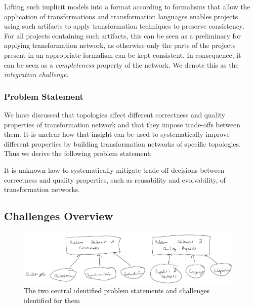 Lifting such implicit models into a format according to formalisms that allow the application of transformations and transformation languages enables projects using such artifacts to apply transformation techniques to preserve consistency.
For all projects containing such artifacts, this can be seen as a preliminary for applying transformation network, as otherwise only the parts of the projects present in an appropriate formalism can be kept consistent.
In consequence, it can be seen as a \emph{completeness} property of the network.
We denote this as the \emph{integration challenge}.

\subsubsection*{Problem Statement}

We have discussed that topologies affect different correctness and quality properties of transformation network and that they impose trade-offs between them.
It is unclear how that insight can be used to systematically improve different properties by building transformation networks of specific topologies.
Thus we derive the following problem statement:

\begin{problemstatement}
    It is unknown how to systematically mitigate trade-off decisions between correctness and quality properties, such as reusability and evolvability, of transformation networks.
\end{problemstatement}


\subsection{Challenges Overview}

\begin{figure}
    \centering
    \includegraphics[width=\textwidth]{figures/prologue/challenges.png}
    \caption[Problem Statements and Challenges]{The two central identified problem statements and challenges identified for them}
    \label{fig:prologue:challenges}
\end{figure}

